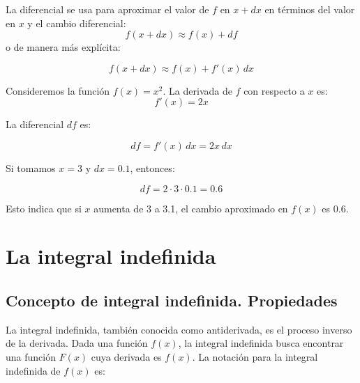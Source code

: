 La diferencial se usa para aproximar el valor de \( f \) en \( x + dx \) en términos del valor en \( x \) y el cambio diferencial:
\[
    f(x + dx) \approx f(x) + df
\]
o de manera más explícita:

\[
f(x + dx) \approx f(x) + f'(x) \, dx
\]

\begin{example}
Consideremos la función \( f(x) = x^2 \). La derivada de \( f \) con respecto a \( x \) es:
\[
f'(x) = 2x
\]

La diferencial \( df \) es:

\[
df = f'(x) \, dx = 2x \, dx
\]

Si tomamos \( x = 3 \) y \( dx = 0.1 \), entonces:

\[
df = 2 \cdot 3 \cdot 0.1 = 0.6
\]

Esto indica que si \( x \) aumenta de 3 a 3.1, el cambio aproximado en \( f(x) \) es 0.6.
\end{example}
\newpage


\section{La integral indefinida} %
\subsection{Concepto de integral indefinida. Propiedades}
La integral indefinida, también conocida como antiderivada, es el proceso inverso de la derivada. Dada una función \( f(x) \), la integral indefinida busca encontrar una función \( F(x) \) cuya derivada es \( f(x) \). La notación para la integral indefinida de \( f(x) \) es:

